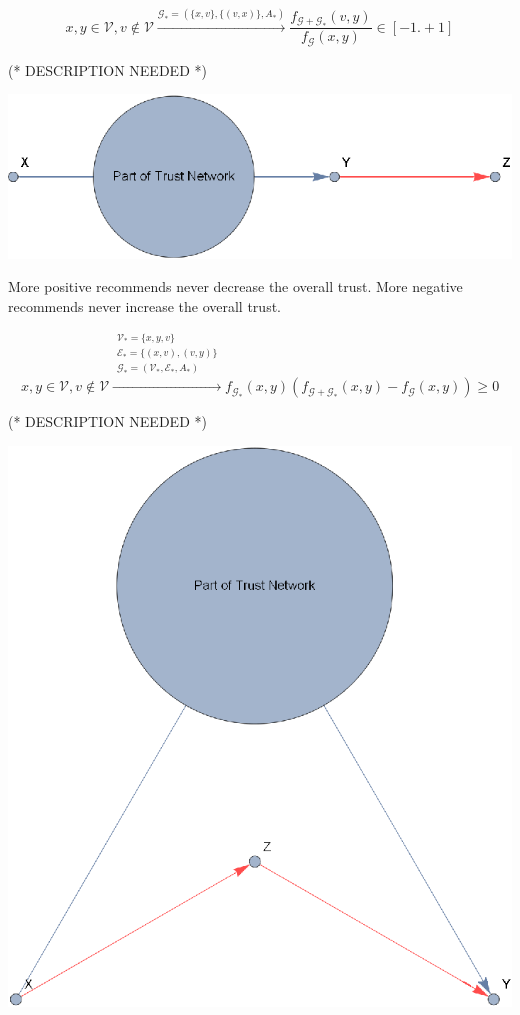 \documentclass{article}
\begin{document}
\begin{equation}
x,y\in \mathcal{V},v\notin \mathcal{V}\overset{\mathcal{G}_*=\left(\{x,v\},\{(v,x)\},A_*\right)}{\to }\frac{f_{\mathcal{G}+\mathcal{G}_*}(v,y)}{f_{\mathcal{G}}(x,y)}\in
[-1.+1]
\end{equation}

(* DESCRIPTION NEEDED *)



\includegraphics{export_gr1.eps}



More positive recommends never decrease the overall trust. More negative recommends never increase the overall trust.

\begin{equation}
x,y\in \mathcal{V},v\notin \mathcal{V}\overset{
\begin{array}{c}
 \mathcal{V}_*=\{x,y,v\} \\
 \mathcal{E}_*=\{(x,v),(v,y)\} \\
 \mathcal{G}_*=\left(\mathcal{V}_*,\mathcal{E}_*,A_*\right) \\
\end{array}
}{\to }f_{\mathcal{G}_*}(x,y)\left(f_{\mathcal{G}+\mathcal{G}_*}(x,y)-f_{\mathcal{G}}(x,y)\right)\geq 0
\end{equation}

(* DESCRIPTION NEEDED *)



\includegraphics{export_gr2.eps}
\end{document}
